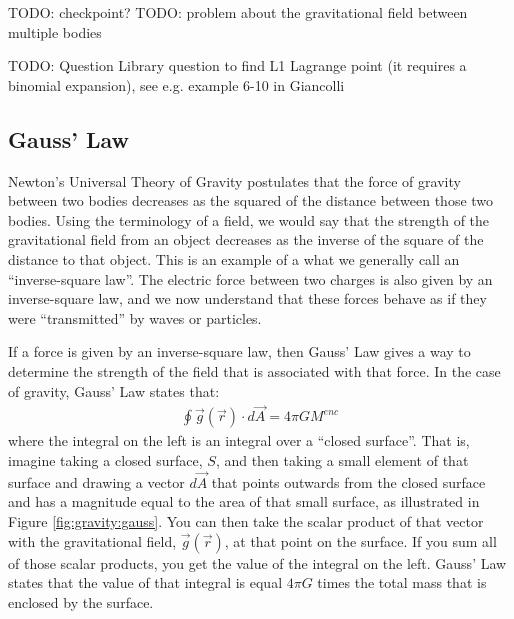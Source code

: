 TODO: checkpoint?
TODO: problem about the gravitational field between multiple bodies

TODO: Question Library question to find L1 Lagrange point (it requires a binomial expansion), see e.g. example 6-10 in Giancolli


\subsection{Gauss' Law}
Newton's Universal Theory of Gravity postulates that the force of gravity between two bodies decreases as the squared of the distance between those two bodies. Using the terminology of a field, we would say that the strength of the gravitational field from an object decreases as the inverse of the square of the distance to that object. This is an example of a what we generally call an ``inverse-square law''. The electric force between two charges is also given by an inverse-square law, and we now understand that these forces behave as if they were ``transmitted'' by waves or particles.

If a force is given by an inverse-square law, then Gauss' Law gives a way to determine the strength of the field that is associated with that force. In the case of gravity, Gauss' Law states that:
\begin{align*}
\oint \vec g(\vec r) \cdot d\vec A = 4\pi G M^{enc}
\end{align*}
where the integral on the left is an integral over a ``closed surface''. That is, imagine taking a closed surface, $S$, and then taking a small element of that surface and drawing a vector $d\vec A$ that points outwards from the closed surface and has a magnitude equal to the area of that small surface, as illustrated in Figure \ref{fig:gravity:gauss}. You can then take the scalar product of that vector with the gravitational field, $\vec g(\vec r)$, at that point on the surface. If you sum all of those scalar products, you get the value of the integral on the left. Gauss' Law states that the value of that integral is equal $4 \pi G$ times the total mass that is enclosed by the surface. 

